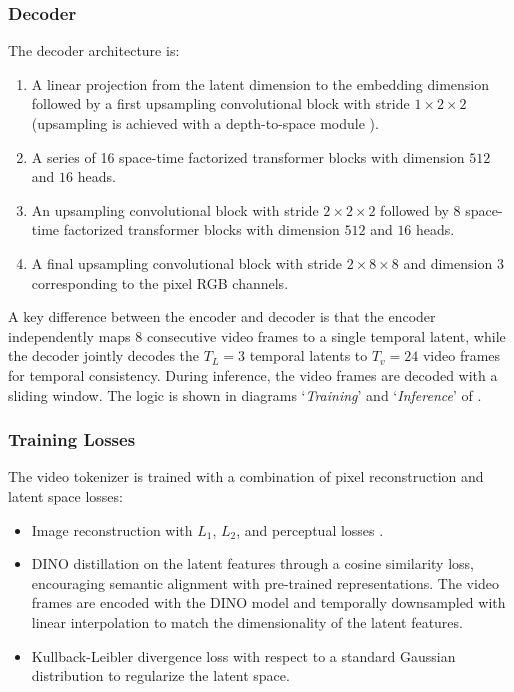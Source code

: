 \subsubsection{Decoder}
The decoder architecture is:
\begin{enumerate}
    \item A linear projection from the latent dimension to the embedding dimension followed by a first upsampling convolutional block with stride $1 \times 2 \times 2$ (upsampling is achieved with a depth-to-space module \citep{shi16}).
    \item A series of 16 space-time factorized transformer blocks with dimension $512$ and $16$ heads.
    \item An upsampling convolutional block with stride $2 \times 2 \times 2$ followed by $8$ space-time factorized transformer blocks with dimension $512$ and $16$ heads.
    \item A final upsampling convolutional block with stride $2 \times 8 \times 8$ and dimension $3$ corresponding to the pixel RGB channels.
\end{enumerate}

A key difference between the encoder and decoder is that the encoder independently maps $8$ consecutive video frames to a single temporal latent, while the decoder jointly decodes the $T_L=3$ temporal latents to $T_v=24$ video frames for temporal consistency. During inference, the video frames are decoded with a sliding window. The logic is shown in diagrams `\textit{Training}' and `\textit{Inference}' of .

\subsubsection{Training Losses}
The video tokenizer is trained with a combination of pixel reconstruction and latent space losses:
\begin{itemize}
    \item Image reconstruction with $L_1$, $L_2$, and perceptual losses \citep{Johnson2016Perceptual}.
    \item DINO \citep{oquab2023dinov2} distillation on the latent features through a cosine similarity loss, encouraging semantic alignment with pre-trained representations. The video frames are encoded with the DINO model and temporally downsampled with linear interpolation to match the dimensionality of the latent features.
    \item Kullback-Leibler divergence loss \citep{kingma14} with respect to a standard Gaussian distribution to regularize the latent space. 
\end{itemize}

